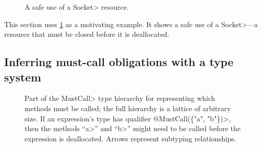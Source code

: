 \begin{figure}
  
  \caption{A safe use of a \<Socket> resource.}
  \label{fig:example}
\end{figure}

\noindent
This section uses \cref{fig:example} as a motivating example.
It shows
a safe use of a \<Socket>---a resource that must be closed before
it is deallocated.

\subsection{Inferring must-call obligations with a type system}
\label{sec:must-call}

\begin{figure}

\caption{Part of the \<MustCall> type hierarchy for representing which methods must be
  called; the full hierarchy is a
  lattice of arbitrary size.
  If an expression's type has qualifier \<@Must\-Call(\{"a", "b"\})>, then
  the methods ``\<a>'' and ``\<b>'' might need to be called before the
  expression is deallocated.
  Arrows represent
  subtyping relationships.
}
\label{fig:must-call-hierarchy}
\end{figure}

